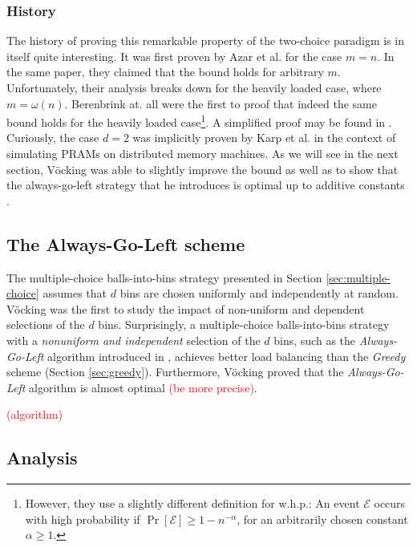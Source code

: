 \documentclass[a4paper,12pt]{article}
\newcommand\todo[1]{\textcolor{red}{(#1)}}
\begin{document}
\subsubsection{History}
\label{sec:historyOfGreedy}
The history of proving this remarkable property of the two-choice paradigm is in itself quite interesting. It was first proven by Azar et al. \cite{ABKU99} for the case $m = n$. In the same paper, they claimed that the bound holds for arbitrary $m$. Unfortunately, their analysis breaks down for the heavily loaded case, where $m = \omega\left(n\right)$. Berenbrink at. all \cite{BFZR08} were the first to proof that indeed the same bound holds for the heavily loaded case\footnote{However, they use a slightly different definition for w.h.p.: An event $\mathcal E$ occurs with high probability if $\Pr\left[\mathcal E \right]  \geq 1- n^{-\alpha}$, for an arbitrarily chosen constant $\alpha \geq 1$.}. A simplified proof may be found in \cite{TW13}. Curiously, the case $d = 2$ was implicitly proven by Karp et al. in the context of simulating PRAMs on distributed memory machines\cite{KLM92}. As we will see in the next section, V\"ocking was able to slightly improve the bound as well as to show that the always-go-left strategy that he introduces is optimal up to additive constants \cite{VOC03}.


\subsection{The Always-Go-Left scheme}
\label{sec:AlwaysGoLeft}
The multiple-choice balls-into-bins strategy presented in Section \ref{sec:multiple-choice} assumes that $d$ bins are chosen uniformly and independently at random. V\"ocking \cite{VOC03} was the first to study the impact of non-uniform and dependent selections of the $d$ bins. Surprisingly, a multiple-choice balls-into-bins strategy with a \emph{nonuniform and independent} selection of the $d$ bins, such as the \emph{Always-Go-Left} algorithm introduced in \cite{VOC03}, achieves better\cite{BCSV06} load balancing than the \emph{Greedy} scheme (Section \ref{sec:greedy}). Furthermore, V\"ocking proved that the \emph{Always-Go-Left} algorithm is almost optimal \todo{be more precise}.

\todo{algorithm}

\subsection{Analysis}
\label{sec:analysis}
\end{document}
